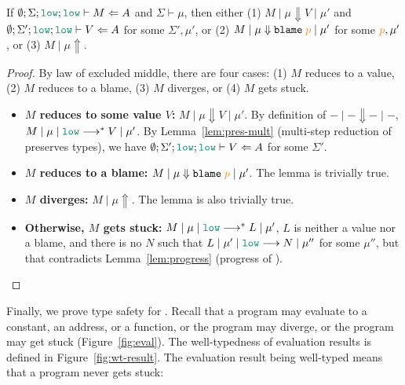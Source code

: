 \begin{lemma}
  \label{lem:pres-bigstep}
  If $\emptyset ; \Sigma ; \low ; \low \vdash M \Leftarrow A$ and $\Sigma \vdash
  \mu$, then either (1) $M \mid \mu \Downarrow V \mid \mu'$ and $\emptyset ;
  \Sigma' ; \low ; \low \vdash V \Leftarrow A$ for some $\Sigma', \mu'$, or (2)
  $M \mid \mu \Downarrow \blame{p} \mid \mu'$ for some $\bl{p}, \mu'$, or (3) $M
  \mid \mu \Uparrow$.
\end{lemma}
\begin{proof}
  By law of excluded middle, there are four cases: (1) $M$ reduces to a value,
  (2) $M$ reduces to a blame, (3) $M$ diverges, or (4) $M$ gets stuck.
  \begin{itemize}
    \item \textbf{$M$ reduces to some value $V$:} $M \mid \mu \Downarrow V \mid
      \mu'$. By definition of ${-}\mid{-}\Downarrow{-}\mid{-}$,
      $\reducemult{M}{\mu}{\low}{V}{\mu'}$. By Lemma~\ref{lem:pres-mult}
      (multi-step reduction of \CC preserves types), we have $\emptyset ; \Sigma' ;
      \low ; \low \vdash V \Leftarrow A$ for some $\Sigma'$.
    \item \textbf{$M$ reduces to a blame:} $M \mid \mu \Downarrow \blame{p} \mid
      \mu'$. The lemma is trivially true.
    \item \textbf{$M$ diverges:} $M \mid \mu \Uparrow$. The lemma is also
      trivially true.
    \item \textbf{Otherwise, $M$ gets stuck:}
      $\reducemult{M}{\mu}{\low}{L}{\mu'}$, $L$ is neither a value nor a blame,
      and there is no $N$ such that $\reduce{L}{\mu'}{\low}{N}{\mu''}$ for some
      $\mu''$, but that contradicts Lemma~\ref{lem:progress} (progress of \CC).
  \end{itemize}
\end{proof}

Finally, we prove type safety for \Surface. Recall that a \Surface program may
evaluate to a constant, an address, or a function, or the program may diverge,
or the program may get stuck (Figure~\ref{fig:eval}). The well-typedness of
evaluation results is defined in Figure~\ref{fig:wt-result}. The evaluation
result being well-typed means that a \Surface program never gets stuck:

